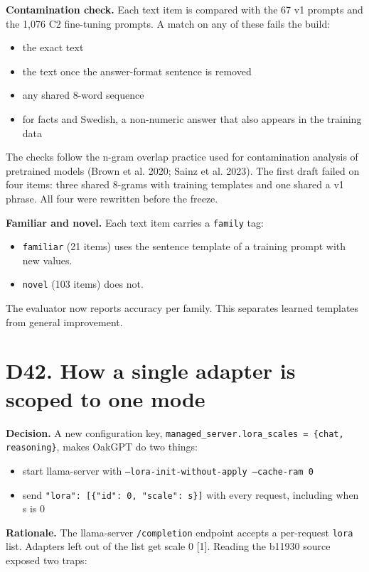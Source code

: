 \documentclass[11pt,a4paper]{article}
\newcommand{\code}[1]{\texttt{#1}}
\begin{document}
\textbf{Contamination check.} Each text item is compared with the 67 v1 prompts and the 1,076 C2 fine-tuning prompts. A match on any of these fails the build:

\begin{itemize}
\item the exact text
\item the text once the answer-format sentence is removed
\item any shared 8-word sequence
\item for facts and Swedish, a non-numeric answer that also appears in the training data
\end{itemize}

The checks follow the n-gram overlap practice used for contamination analysis of pretrained models (Brown et al. 2020; Sainz et al. 2023). The first draft failed on four items: three shared 8-grams with training templates and one shared a v1 phrase. All four were rewritten before the freeze.

\textbf{Familiar and novel.} Each text item carries a \code{family} tag:

\begin{itemize}
\item \code{familiar} (21 items) uses the sentence template of a training prompt with new values.
\item \code{novel} (103 items) does not.
\end{itemize}

The evaluator now reports accuracy per family. This separates learned templates from general improvement.

\section{D42. How a single adapter is scoped to one mode}

\textbf{Decision.} A new configuration key, \code{managed\_server.lora\_scales = \{chat, reasoning\}}, makes OakGPT do two things:

\begin{itemize}
\item start llama-server with \code{--lora-init-without-apply --cache-ram 0}
\item send \code{"lora": [\{"id": 0, "scale": s\}]} with every request, including when s is 0
\end{itemize}

\textbf{Rationale.} The llama-server \code{/completion} endpoint accepts a per-request \code{lora} list. Adapters left out of the list get scale 0 [1]. Reading the b11930 source exposed two traps:
\end{document}
